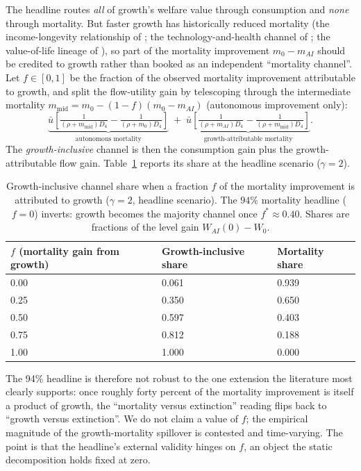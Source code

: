 \documentclass{_latex/house}
\begin{document}
The headline routes \emph{all} of growth's welfare value through consumption and \emph{none} through mortality. But faster growth has historically reduced mortality (the income-longevity relationship of \citealp{preston1975changing}; the technology-and-health channel of \citealp{cutler2006determinants}; the value-of-life lineage of \citealp{hall2007value}), so part of the mortality improvement $m_0-m_{AI}$ should be credited to growth rather than booked as an independent ``mortality channel''. Let $f\in[0,1]$ be the fraction of the observed mortality improvement attributable to growth, and split the flow-utility gain by telescoping through the intermediate mortality $m_{\text{mid}}=m_0-(1-f)(m_0-m_{AI})$ (autonomous improvement only):
\begin{equation}
\underbrace{\bar u\!\left[\tfrac{1}{(\rho+m_{\text{mid}})D_4}-\tfrac{1}{(\rho+m_0)D_4}\right]}_{\text{autonomous mortality}}
\;+\;
\underbrace{\bar u\!\left[\tfrac{1}{(\rho+m_{AI})D_4}-\tfrac{1}{(\rho+m_{\text{mid}})D_4}\right]}_{\text{growth-attributable mortality}} .
\label{eq:spillover-split}
\end{equation}
The \emph{growth-inclusive} channel is then the consumption gain plus the growth-attributable flow gain. Table~\ref{tab:spillover} reports its share at the headline scenario ($\gamma=2$).

\begin{table}[!ht]
\centering
\begin{tabular}{l|ll}
\toprule
$f$ (mortality gain from growth) & Growth-inclusive share & Mortality share \\
\midrule
0.00 & 0.061 & 0.939 \\
0.25 & 0.350 & 0.650 \\
0.50 & 0.597 & 0.403 \\
0.75 & 0.812 & 0.188 \\
1.00 & 1.000 & 0.000 \\
\bottomrule
\end{tabular}
\caption{Growth-inclusive channel share when a fraction $f$ of the mortality improvement is attributed to growth ($\gamma=2$, headline scenario). The $94\%$ mortality headline ($f=0$) inverts: growth becomes the majority channel once $f^*\approx0.40$. Shares are fractions of the level gain $W_{AI}(0)-W_0$.}
\label{tab:spillover}
\end{table}

The 94\% headline is therefore not robust to the one extension the literature most clearly supports: once roughly forty percent of the mortality improvement is itself a product of growth, the ``mortality versus extinction'' reading flips back to ``growth versus extinction''. We do not claim a value of $f$; the empirical magnitude of the growth-mortality spillover is contested and time-varying. The point is that the headline's external validity hinges on $f$, an object the static decomposition holds fixed at zero.
\end{document}
